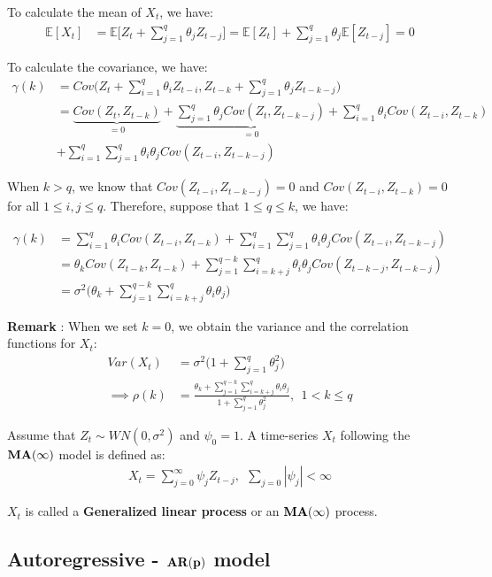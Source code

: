 \begin{proof*}
    To calculate the mean of $X_t$, we have:
    \begin{align*}
        \mathbb{E}[X_t] &= \mathbb{E}\Bigg[
            Z_t + \sum_{j=1}^q \theta_jZ_{t-j} 
        \Bigg] = \mathbb{E}[Z_t] + \sum_{j=1}^q\theta_j \mathbb{E}[Z_{t-j}] = 0
    \end{align*}

    \noindent To calculate the covariance, we have:
    \begin{align*}
        \gamma(k) &= Cov\Bigg( 
            Z_t + \sum_{i=1}^q \theta_i Z_{t-i}, Z_{t-k} + \sum_{j=1}^q \theta_j Z_{t-k-j}    
        \Bigg) \\
        &= \underbrace{Cov(Z_t, Z_{t-k})}_{=0} + \underbrace{\sum_{j=1}^q \theta_j Cov(Z_t, Z_{t-k-j})}_{=0} + \sum_{i=1}^q \theta_i Cov(Z_{t-i}, Z_{t-k}) \\ &+ \sum_{i=1}^q\sum_{j=1}^q \theta_i\theta_j Cov(Z_{t-i}, Z_{t-k-j})
    \end{align*}

    \noindent When $k > q$, we know that $Cov(Z_{t-i}, Z_{t-k-j})=0$ and $Cov(Z_{t-i}, Z_{t-k})=0$ for all $1 \le i, j \le q$. Therefore, suppose that $1\le q\le k$, we have:

    \begin{align*}
        \gamma(k) &= \sum_{i=1}^q \theta_i Cov(Z_{t-i}, Z_{t-k}) + \sum_{i=1}^q\sum_{j=1}^q \theta_i\theta_j Cov(Z_{t-i}, Z_{t-k-j}) \\
        &= \theta_k Cov(Z_{t-k}, Z_{t-k}) + \sum_{j=1}^{q-k}\sum_{i=k+j}^q \theta_i \theta_j Cov(Z_{t-k-j}, Z_{t-k-j}) \\
        &= \sigma^2\Bigg( 
            \theta_k  + \sum_{j=1}^{q-k}\sum_{i=k+j}^q \theta_i \theta_j
        \Bigg)
    \end{align*}

    \noindent \textbf{Remark} : When we set $k=0$, we obtain the variance and the correlation functions for $X_t$:
    \begin{align*}
        Var(X_t) &= \sigma^2 \Bigg( 1 + \sum_{j=1}^q \theta_j^2 \Bigg) \\
        \implies 
        \rho(k) &= \frac{\theta_k  + \sum_{j=1}^{q-k}\sum_{i=k+j}^q \theta_i \theta_j}{1+\sum_{j=1}^q \theta_j^2 }, \ \ 1 < k \le q
    \end{align*}
\end{proof*}

\begin{definition}
    Assume that $Z_t\sim WN(0, \sigma^2)$ and $\psi_0=1$. A time-series $X_t$ following the $\bf MA(\infty)$ model is defined as:
    \begin{align*}
        X_t = \sum_{j=0}^\infty \psi_j Z_{t-j}, \ \ \sum_{j=0}|\psi_j| < \infty
    \end{align*}

    \noindent $X_t$ is called a \textbf{Generalized linear process} or an $\bf MA(\infty)$ process. 
\end{definition}

\subsection{Autoregressive - ${\bf AR(p)}$ model}

